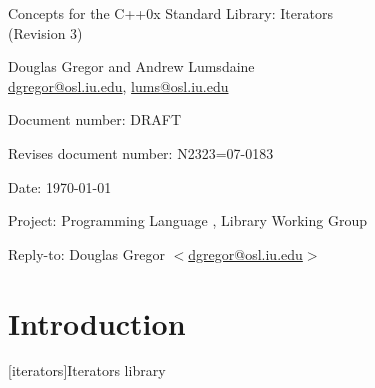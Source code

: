 \documentclass[american,twoside]{book}
\begin{document}
\raggedbottom

\begin{titlepage}
\begin{center}
\huge
Concepts for the C++0x Standard Library: Iterators \\
(Revision 3)
\vspace{0.5in}

\normalsize
Douglas Gregor and Andrew Lumsdaine \\
\href{mailto:dgregor@osl.iu.edu}{dgregor@osl.iu.edu}, \href{mailto:lums@osl.iu.edu}{lums@osl.iu.edu}
\end{center}

\vspace{1in}
\par\noindent Document number: DRAFT \vspace{-6pt}
\par\noindent Revises document number: N2323=07-0183 \vspace{-6pt}
\par\noindent Date: \today\vspace{-6pt}
\par\noindent Project: Programming Language \Cpp{}, Library Working Group\vspace{-6pt}
\par\noindent Reply-to: Douglas Gregor $<$\href{mailto:dgregor@osl.iu.edu}{dgregor@osl.iu.edu}$>$\vspace{-6pt}

\section*{Introduction}
\end{titlepage}

\pagestyle{fancy}
\fancyhead[LE,RO]{\textbf{\rightmark}}
\fancyhead[RE]{\textbf{\leftmark\hspace{1em}\thepage}}
\fancyhead[LO]{\textbf{\thepage\hspace{1em}\leftmark}}


\renewcommand{\sectionmark}[1]{\markright{\thesection\hspace{1em}#1}}
\renewcommand{\chaptermark}[1]{\markboth{#1}{}}

\setcounter{chapter}{23}
[iterators]{Iterators library}
\end{document}

